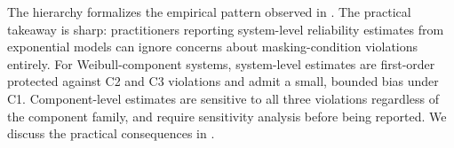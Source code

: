 The hierarchy formalizes the empirical pattern observed in
. The practical takeaway is sharp: practitioners
reporting system-level reliability estimates from exponential models can
ignore concerns about masking-condition violations entirely. For
Weibull-component systems, system-level estimates are first-order
protected against C2 and C3 violations and admit a small, bounded bias
under C1. Component-level estimates are sensitive to all three violations
regardless of the component family, and require sensitivity analysis
before being reported. We discuss the practical consequences in
.
